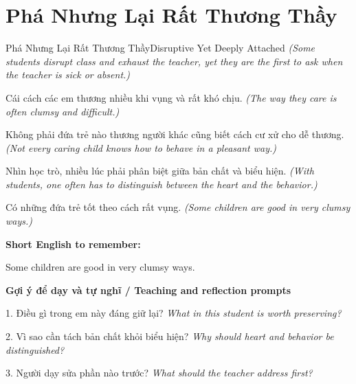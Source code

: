 \section{Phá Nhưng Lại Rất Thương Thầy}
\begin{truyen}{Phá Nhưng Lại Rất Thương Thầy}{Disruptive Yet Deeply Attached}
\textit{(Some students disrupt class and exhaust the teacher, yet they are the first to ask when the teacher is sick or absent.)}

Cái cách các em thương nhiều khi vụng và rất khó chịu.
\textit{(The way they care is often clumsy and difficult.)}

Không phải đứa trẻ nào thương người khác cũng biết cách cư xử cho dễ thương.
\textit{(Not every caring child knows how to behave in a pleasant way.)}

Nhìn học trò, nhiều lúc phải phân biệt giữa bản chất và biểu hiện.
\textit{(With students, one often has to distinguish between the heart and the behavior.)}

\end{truyen}

\begin{baihoc}
Có những đứa trẻ tốt theo cách rất vụng.
\textit{(Some children are good in very clumsy ways.)}
\end{baihoc}

\begin{ghinhoanh}
\textbf{Short English to remember:}

Some children are good in very clumsy ways.

\end{ghinhoanh}

\begin{tuhocnhanh}
\textbf{Gợi ý để dạy và tự nghĩ / Teaching and reflection prompts}

1. Điều gì trong em này đáng giữ lại? \textit{What in this student is worth preserving?}

2. Vì sao cần tách bản chất khỏi biểu hiện? \textit{Why should heart and behavior be distinguished?}

3. Người dạy sửa phần nào trước? \textit{What should the teacher address first?}
\end{tuhocnhanh}
\ngancach


